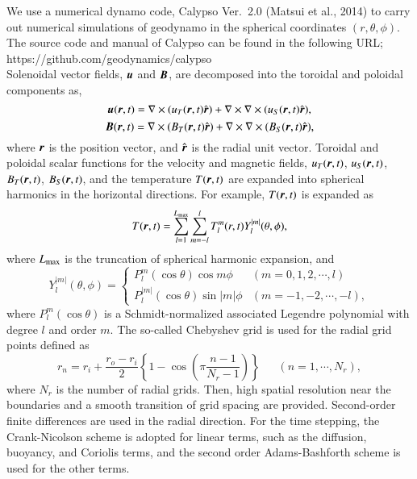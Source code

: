 We use a numerical dynamo code, Calypso Ver.~2.0 
{\color{red}
(Matsui et al., 2014) to carry out numerical simulations of geodynamo in the spherical coordinates $(r, \theta, \phi)$.
}
%
The source code and manual of Calypso can be found in the following URL;\\
https://github.com/geodynamics/calypso\\
%
Solenoidal vector fields, $\mbox{\boldmath$u$}$ and $\mbox{\boldmath$B$}$, are decomposed into the toroidal and poloidal components
{\color{red}
as,
%
\begin{equation}
    \mbox{\boldmath$u$} (\mbox{\boldmath$r$}, t) = \nabla \times ( u_T (\mbox{\boldmath$r$}, t) \hat{\mbox{\boldmath$r$}} ) + \nabla \times \nabla \times ( u_S (\mbox{\boldmath$r$}, t) \hat{\mbox{\boldmath$r$}} ),
\label{eq:uT_uS}
\end{equation}
%
\begin{equation}
    \mbox{\boldmath$B$} (\mbox{\boldmath$r$}, t) = \nabla \times ( B_T (\mbox{\boldmath$r$}, t) \hat{\mbox{\boldmath$r$}} ) + \nabla \times \nabla \times ( B_S (\mbox{\boldmath$r$}, t) \hat{\mbox{\boldmath$r$}} ),
\label{eq:BT_BS}
\end{equation}
where $\mbox{\boldmath$r$}$ is the position vector, and $\hat{\mbox{\boldmath$r$}}$ is the radial unit vector.
}
{\color{red}
Toroidal and poloidal scalar functions for the velocity and magnetic fields, $u_T (\mbox{\boldmath$r$}, t)$, $u_S (\mbox{\boldmath$r$}, t)$, $B_T (\mbox{\boldmath$r$}, t)$, $B_S (\mbox{\boldmath$r$}, t)$, and the temperature $T (\mbox{\boldmath$r$}, t)$
}
are expanded into spherical harmonics in the horizontal directions.
{\color{red}
For example, $T (\mbox{\boldmath$r$}, t)$ is expanded as
%
\begin{equation}
    T(\mbox{\boldmath$r$}, t) = \sum_{l=1}^{L_{\rm max}} \sum_{m=-l}^{l} T_l^m (r, t) Y_l^{|m|} (\theta, \phi),
\label{eq:T_expansion}
\end{equation}
%
where $L_{\rm max}$ is the truncation of spherical harmonic expansion, and
%
\begin{equation}
Y_l^{|m|} (\theta, \phi) = \left\{
 \begin{array}{ll}
 P_l^m(\cos\theta)\cos m\phi & (m = 0, 1, 2, \cdots, l)
 \\
 P_l^{|m|}(\cos\theta)\sin |m|\phi & (m = -1, -2, \cdots, -l) ,
 \end{array}
\right.
\label{eq:def_of_Ylm}
\end{equation}
%
where $P_l^m (\cos \theta )$ is a Schmidt-normalized associated Legendre polynomial with degree $l$ and order $m$.
The so-called Chebyshev grid is used for the radial grid points defined as
%
\begin{equation}
r_n = r_i + \frac{r_o - r_i}{2} \left\{ 1 - \cos \left( \pi \frac{n-1}{N_r-1} \right) \right\} ~~\;\;\;\; (n = 1, \cdots , N_r) ,
\label{eq:def_of_rn}
\end{equation}
%
where $N_r$ is the number of radial grids.
Then, high spatial resolution near the boundaries and a smooth transition of grid spacing are provided.
}
Second-order finite differences are used in the radial direction.
For the time stepping, the Crank-Nicolson scheme is adopted for linear terms, such as the diffusion, buoyancy, and Coriolis terms, and the second order Adams-Bashforth scheme is used for the other terms.

